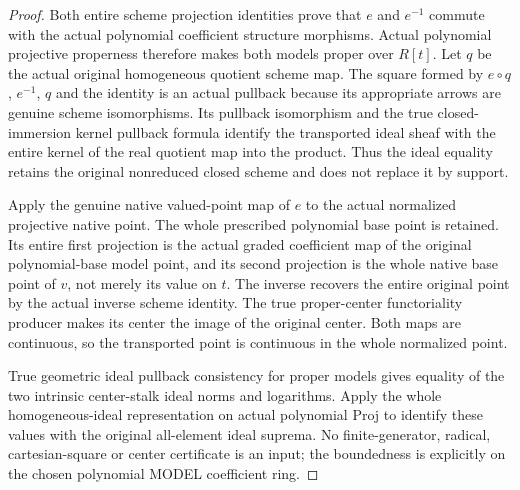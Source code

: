 \begin{proof}
Both entire scheme projection identities prove that $e$ and $e^{-1}$
commute with the actual polynomial coefficient structure morphisms.
Actual polynomial projective properness therefore makes both models proper
over $R[t]$. Let $q$ be the actual original homogeneous quotient scheme
map. The square formed by $e\circ q$, $e^{-1}$, $q$ and the identity is
an actual pullback because its appropriate arrows are genuine scheme
isomorphisms. Its pullback isomorphism and the true closed-immersion kernel
pullback formula identify the transported ideal sheaf with the entire kernel
of the real quotient map into the product. Thus the ideal equality retains
the original nonreduced closed scheme and does not replace it by support.

Apply the genuine native valued-point map of $e$ to the actual normalized
projective native point. The whole prescribed polynomial base point is
retained. Its entire first projection is the actual graded coefficient map
of the original polynomial-base model point, and its second projection is
the whole native base point of $v$, not merely its value on $t$. The inverse
recovers the entire original point by the actual inverse scheme identity.
The true proper-center functoriality producer makes its center the image
of the original center. Both maps are continuous, so the transported point
is continuous in the whole normalized point.

True geometric ideal pullback consistency for proper models gives equality
of the two intrinsic center-stalk ideal norms and logarithms. Apply the
whole homogeneous-ideal representation on actual polynomial Proj to identify
these values with the original all-element ideal suprema. No finite-generator,
radical, cartesian-square or center certificate is an input; the boundedness
is explicitly on the chosen polynomial MODEL coefficient ring.
\end{proof}

